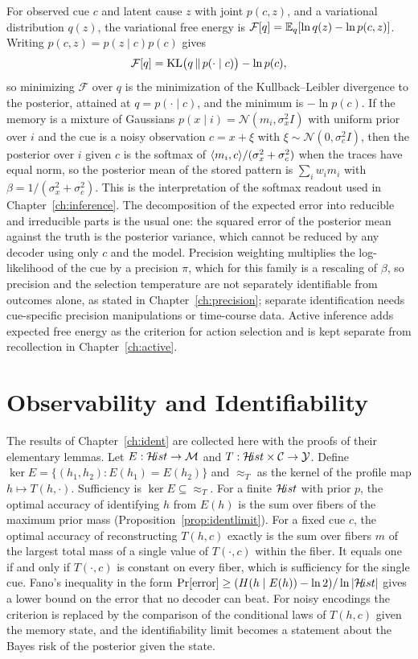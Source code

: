 For observed cue $c$ and latent cause $z$ with joint $p(c,z)$, and a variational distribution $q(z)$, the variational free energy is $\mathcal F[q]=\mathbb{E}_q[\ln q(z)-\ln p(c,z)]$. Writing $p(c,z)=p(z\mid c)p(c)$ gives
\begin{equation}
\mathcal F[q]=\operatorname{KL}\bigl(q\,\Vert\,p(\cdot\mid c)\bigr)-\ln p(c),
\end{equation}
so minimizing $\mathcal F$ over $q$ is the minimization of the Kullback--Leibler divergence to the posterior, attained at $q=p(\cdot\mid c)$, and the minimum is $-\ln p(c)$. If the memory is a mixture of Gaussians $p(x\mid i)=\mathcal N(m_i,\sigma_x^2I)$ with uniform prior over $i$ and the cue is a noisy observation $c=x+\xi$ with $\xi\sim\mathcal N(0,\sigma_c^2I)$, then the posterior over $i$ given $c$ is the softmax of $\langle m_i,c\rangle/(\sigma_x^2+\sigma_c^2)$ when the traces have equal norm, so the posterior mean of the stored pattern is $\sum_iw_im_i$ with $\beta=1/(\sigma_x^2+\sigma_c^2)$. This is the interpretation of the softmax readout used in Chapter~\ref{ch:inference}. The decomposition of the expected error into reducible and irreducible parts is the usual one: the squared error of the posterior mean against the truth is the posterior variance, which cannot be reduced by any decoder using only $c$ and the model. Precision weighting multiplies the log-likelihood of the cue by a precision $\pi$, which for this family is a rescaling of $\beta$, so precision and the selection temperature are not separately identifiable from outcomes alone, as stated in Chapter~\ref{ch:precision}; separate identification needs cue-specific precision manipulations or time-course data. Active inference adds expected free energy as the criterion for action selection and is kept separate from recollection in Chapter~\ref{ch:active}.

\chapter{Observability and Identifiability}\label{app:ident}

The results of Chapter~\ref{ch:ident} are collected here with the proofs of their elementary lemmas. Let $E:\mathcal{H}\!ist\to\mathcal{M}$ and $T:\mathcal{H}\!ist\times\mathcal{C}\to\mathcal{Y}$. Define $\ker E=\{(h_1,h_2):E(h_1)=E(h_2)\}$ and $\approx_T$ as the kernel of the profile map $h\mapsto T(h,\cdot)$. Sufficiency is $\ker E\subseteq{\approx_T}$. For a finite $\mathcal{H}\!ist$ with prior $p$, the optimal accuracy of identifying $h$ from $E(h)$ is the sum over fibers of the maximum prior mass (Proposition~\ref{prop:identlimit}). For a fixed cue $c$, the optimal accuracy of reconstructing $T(h,c)$ exactly is the sum over fibers $m$ of the largest total mass of a single value of $T(\cdot,c)$ within the fiber. It equals one if and only if $T(\cdot,c)$ is constant on every fiber, which is sufficiency for the single cue. Fano's inequality in the form $\Pr[\text{error}]\ge(H(h\mid E(h))-\ln2)/\ln|\mathcal{H}\!ist|$ gives a lower bound on the error that no decoder can beat. For noisy encodings the criterion is replaced by the comparison of the conditional laws of $T(h,c)$ given the memory state, and the identifiability limit becomes a statement about the Bayes risk of the posterior given the state.

